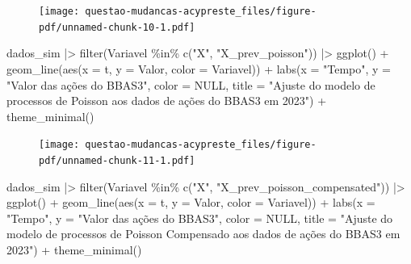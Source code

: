 \documentclass[
  letterpaper,
  DIV=11,
  numbers=noendperiod]{scrreprt}
\newenvironment{Shaded}{\begin{snugshade}}{\end{snugshade}}
\newcommand{\AttributeTok}[1]{\textcolor[rgb]{0.40,0.45,0.13}{#1}}
\newcommand{\ConstantTok}[1]{\textcolor[rgb]{0.56,0.35,0.01}{#1}}
\newcommand{\FunctionTok}[1]{\textcolor[rgb]{0.28,0.35,0.67}{#1}}
\newcommand{\NormalTok}[1]{\textcolor[rgb]{0.00,0.23,0.31}{#1}}
\newcommand{\SpecialCharTok}[1]{\textcolor[rgb]{0.37,0.37,0.37}{#1}}
\newcommand{\StringTok}[1]{\textcolor[rgb]{0.13,0.47,0.30}{#1}}
\begin{document}
\begin{figure}[H]

{\centering \texttt{[image: questao-mudancas-acypreste\_files/figure-pdf/unnamed-chunk-10-1.pdf]}

}

\end{figure}

\begin{Shaded}
\begin{Highlighting}[]
\NormalTok{dados\_sim }\SpecialCharTok{|\textgreater{}}
    \FunctionTok{filter}\NormalTok{(Variavel }\SpecialCharTok{\%in\%} \FunctionTok{c}\NormalTok{(}\StringTok{"X"}\NormalTok{, }\StringTok{"X\_prev\_poisson"}\NormalTok{)) }\SpecialCharTok{|\textgreater{}}
    \FunctionTok{ggplot}\NormalTok{() }\SpecialCharTok{+}
    \FunctionTok{geom\_line}\NormalTok{(}\FunctionTok{aes}\NormalTok{(}\AttributeTok{x =}\NormalTok{ t, }\AttributeTok{y =}\NormalTok{ Valor, }\AttributeTok{color =}\NormalTok{ Variavel)) }\SpecialCharTok{+}
    \FunctionTok{labs}\NormalTok{(}\AttributeTok{x =} \StringTok{"Tempo"}\NormalTok{,}
         \AttributeTok{y =} \StringTok{"Valor das ações do BBAS3"}\NormalTok{,}
         \AttributeTok{color =} \ConstantTok{NULL}\NormalTok{,}
         \AttributeTok{title =} \StringTok{"Ajuste do modelo de processos de Poisson}
\StringTok{          aos dados de ações do BBAS3 em 2023"}\NormalTok{) }\SpecialCharTok{+}
    \FunctionTok{theme\_minimal}\NormalTok{()}
\end{Highlighting}
\end{Shaded}

\begin{figure}[H]

{\centering \texttt{[image: questao-mudancas-acypreste\_files/figure-pdf/unnamed-chunk-11-1.pdf]}

}

\end{figure}

\begin{Shaded}
\begin{Highlighting}[]
\NormalTok{dados\_sim }\SpecialCharTok{|\textgreater{}}
    \FunctionTok{filter}\NormalTok{(Variavel  }\SpecialCharTok{\%in\%} \FunctionTok{c}\NormalTok{(}\StringTok{"X"}\NormalTok{, }\StringTok{"X\_prev\_poisson\_compensated"}\NormalTok{)) }\SpecialCharTok{|\textgreater{}}
    \FunctionTok{ggplot}\NormalTok{() }\SpecialCharTok{+}
    \FunctionTok{geom\_line}\NormalTok{(}\FunctionTok{aes}\NormalTok{(}\AttributeTok{x =}\NormalTok{ t, }\AttributeTok{y =}\NormalTok{ Valor, }\AttributeTok{color =}\NormalTok{ Variavel)) }\SpecialCharTok{+}
    \FunctionTok{labs}\NormalTok{(}\AttributeTok{x =} \StringTok{"Tempo"}\NormalTok{,}
         \AttributeTok{y =} \StringTok{"Valor das ações do BBAS3"}\NormalTok{,}
         \AttributeTok{color =} \ConstantTok{NULL}\NormalTok{,}
         \AttributeTok{title =} \StringTok{"Ajuste do modelo de processos de Poisson Compensado}
\StringTok{          aos dados de ações do BBAS3 em 2023"}\NormalTok{) }\SpecialCharTok{+}
    \FunctionTok{theme\_minimal}\NormalTok{()}
\end{Highlighting}
\end{Shaded}
\end{document}
